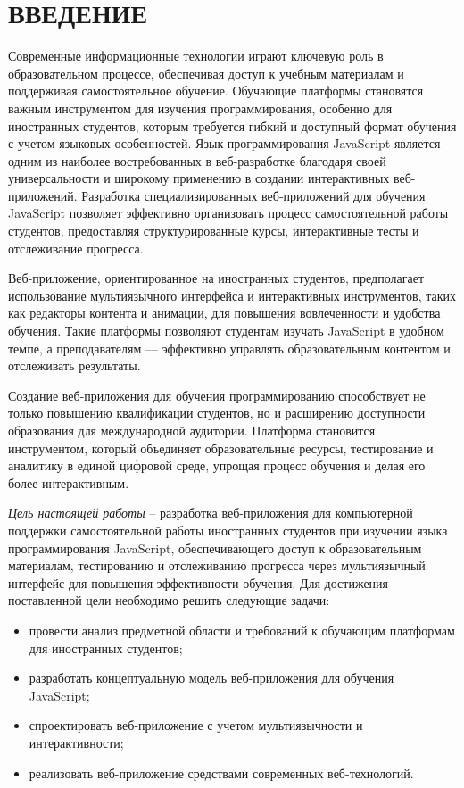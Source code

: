\section*{ВВЕДЕНИЕ}

Современные информационные технологии играют ключевую роль в образовательном процессе, обеспечивая доступ к учебным материалам и поддерживая самостоятельное обучение. Обучающие платформы становятся важным инструментом для изучения программирования, особенно для иностранных студентов, которым требуется гибкий и доступный формат обучения с учетом языковых особенностей. Язык программирования JavaScript является одним из наиболее востребованных в веб-разработке благодаря своей универсальности и широкому применению в создании интерактивных веб-приложений. Разработка специализированных веб-приложений для обучения JavaScript позволяет эффективно организовать процесс самостоятельной работы студентов, предоставляя структурированные курсы, интерактивные тесты и отслеживание прогресса.

Веб-приложение, ориентированное на иностранных студентов, предполагает использование мультиязычного интерфейса и интерактивных инструментов, таких как редакторы контента и анимации, для повышения вовлеченности и удобства обучения. Такие платформы позволяют студентам изучать JavaScript в удобном темпе, а преподавателям — эффективно управлять образовательным контентом и отслеживать результаты.

Создание веб-приложения для обучения программированию способствует не только повышению квалификации студентов, но и расширению доступности образования для международной аудитории. Платформа становится инструментом, который объединяет образовательные ресурсы, тестирование и аналитику в единой цифровой среде, упрощая процесс обучения и делая его более интерактивным.

\emph{Цель настоящей работы} – разработка веб-приложения для компьютерной поддержки самостоятельной работы иностранных студентов при изучении языка программирования JavaScript, обеспечивающего доступ к образовательным материалам, тестированию и отслеживанию прогресса через мультиязычный интерфейс для повышения эффективности обучения. Для достижения поставленной цели необходимо решить следующие задачи:
\begin{itemize}
	\item провести анализ предметной области и требований к обучающим платформам для иностранных студентов;
	\item разработать концептуальную модель веб-приложения для обучения JavaScript;
	\item спроектировать веб-приложение с учетом мультиязычности и интерактивности;
	\item реализовать веб-приложение средствами современных веб-технологий.
\end{itemize}

